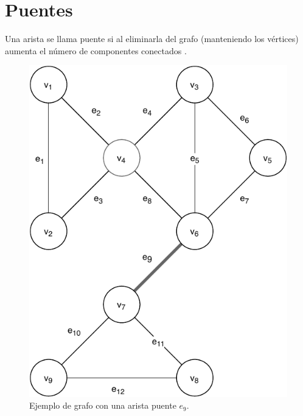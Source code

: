 \section{Puentes}\label{bridges}
Una arista se llama puente si al eliminarla del grafo (manteniendo los vértices) aumenta el número de componentes conectados \cite{Jaimini2017}.

\begin{figure}[H]
	\centering
	\includegraphics[width=0.4\linewidth]{document/ArticulationPoints/images/example-of-bridge}
	\caption{Ejemplo de grafo con una arista puente \( e_9 \).}
	\label{fig:connected-disconnected-graph}
\end{figure}
